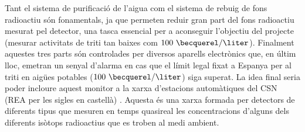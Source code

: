 Tant el sistema de purificació de l'aigua com el sistema de rebuig de fons radioactiu són fonamentals, ja que permeten reduir gran part del fons radioactiu mesurat pel detector, una tasca essencial per a aconseguir l'objectiu del projecte (mesurar activitats de triti tan baixes com $100~\becquerel/\liter$). Finalment aquestes tres parts són controlades per diversos aparells electrònics que, en últim lloc, emetran un senyal d'alarma en cas que el límit legal fixat a Espanya per al triti en aigües potables ($100~\becquerel/\liter$) siga superat. La idea final seria poder incloure aquest monitor a la xarxa d'estacions automàtiques del CSN (REA per les sigles en castellà) \cite{REA}. Aquesta és una xarxa formada per detectors de diferents tipus que mesuren en temps quasireal les concentracions d'alguns dels diferents isòtops radioactius que es troben al medi ambient. 
